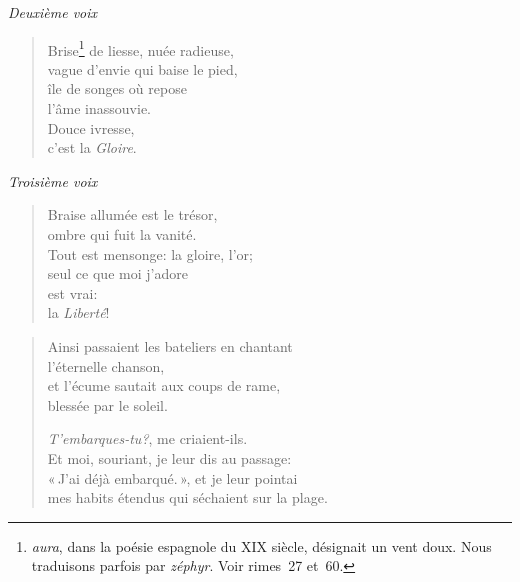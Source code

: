 \begin{center} \emph{Deuxième voix} \end{center}

\begin{verse}
  Brise\footnote{\emph{aura}, dans la poésie espagnole du XIX\ieme{}
  siècle, désignait un vent doux. Nous traduisons parfois par
  \emph{zéphyr}. Voir rimes~27 et~60.} de liesse, nuée radieuse, \\
  vague d'envie qui baise le pied, \\
  île de songes où repose \\
  l'âme inassouvie. \\
  Douce ivresse, \\
  c'est la \emph{Gloire}.
\end{verse}

\begin{center} \emph{Troisième voix} \end{center}

\begin{verse}
  Braise allumée est le trésor, \\
  ombre qui fuit la vanité. \\
  Tout est mensonge: la gloire, l'or; \\
  seul ce que moi j'adore \\
  est vrai: \\
  la \emph{Liberté}!
\end{verse}

\pagebreak

\begin{verse}
  Ainsi passaient les bateliers en chantant \\
  l'éternelle chanson, \\
  et l'écume sautait aux coups de rame, \\
  blessée par le soleil.

  \emph{T'embarques-tu?}, me criaient-ils. \\
  Et moi, souriant, je leur dis au passage: \\
  «\,J'ai déjà embarqué.\,», et je leur pointai \\
  mes habits étendus qui séchaient sur la plage.
\end{verse}



